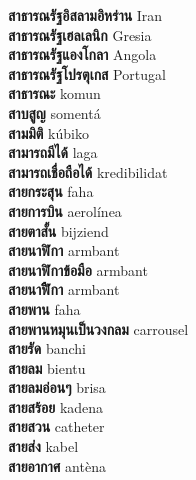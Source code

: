 \textbf{ สาธารณรัฐอิสลามอิหร่าน  } Iran \\
\textbf{ สาธารณรัฐเฮลเลนิก  } Gresia \\
\textbf{ สาธารณรัฐแองโกลา  } Angola \\
\textbf{ สาธารณรัฐโปรตุเกส  } Portugal \\
\textbf{ สาธารณะ  } komun \\
\textbf{ สาบสูญ  } somentá \\
\textbf{ สามมิติ  } kúbiko \\
\textbf{ สามารถมีได้  } laga \\
\textbf{ สามารถเชื่อถือได้  } kredibilidat \\
\textbf{ สายกระสุน  } faha \\
\textbf{ สายการบิน  } aerolínea \\
\textbf{ สายตาสั้น  } bijziend \\
\textbf{ สายนาฬิกา  } armbant \\
\textbf{ สายนาฬิกาข้อมือ  } armbant \\
\textbf{ สายนาฬิืกา  } armbant \\
\textbf{ สายพาน  } faha \\
\textbf{ สายพานหมุนเป็นวงกลม  } carrousel \\
\textbf{ สายรัด  } banchi \\
\textbf{ สายลม  } bientu \\
\textbf{ สายลมอ่อนๆ  } brisa \\
\textbf{ สายสร้อย  } kadena \\
\textbf{ สายสวน  } catheter \\
\textbf{ สายส่ง  } kabel \\
\textbf{ สายอากาศ  } antèna \\
